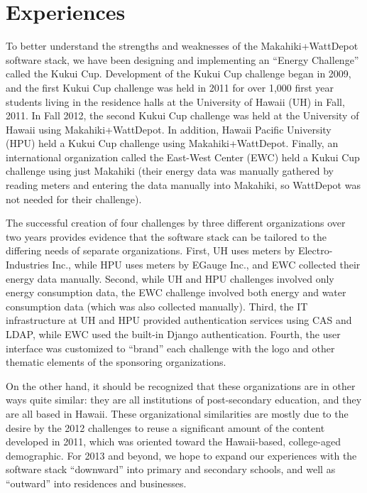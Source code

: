 \section{Experiences}

To better understand the strengths and weaknesses of the Makahiki+WattDepot software stack, we have been designing and implementing an ``Energy Challenge'' called the Kukui Cup.  Development of the Kukui Cup challenge began in 2009, and the first Kukui Cup challenge was held in 2011 for over 1,000 first year students living in the residence halls at the University of Hawaii (UH) in Fall, 2011.  In Fall 2012, the second Kukui Cup challenge was held at the University of Hawaii using Makahiki+WattDepot.  In addition, Hawaii Pacific University (HPU) held a Kukui Cup challenge using Makahiki+WattDepot. Finally, an international organization called the East-West Center (EWC) held a Kukui Cup challenge using just Makahiki (their energy data was manually gathered by reading meters and entering the data manually into Makahiki, so WattDepot was not needed for their challenge).

The successful creation of four challenges by three different organizations over two years provides evidence that the software stack can be tailored to the differing needs of separate organizations.  First, UH uses meters by Electro-Industries Inc., while HPU uses meters by EGauge Inc., and EWC collected their energy data manually. Second, while UH and HPU challenges involved only energy consumption data, the EWC challenge involved both energy and water consumption data (which was also collected manually).  Third, the IT infrastructure at UH and HPU provided authentication services using CAS and LDAP, while EWC used the built-in Django authentication. Fourth, the user interface was customized to ``brand'' each challenge with the logo and other thematic elements of the sponsoring organizations.

On the other hand, it should be recognized that these organizations are in other ways quite similar: they are all institutions of post-secondary education, and they are all based in Hawaii.  These organizational similarities are mostly due to the desire by the 2012 challenges to reuse a significant amount of the content developed in 2011, which was oriented toward the Hawaii-based, college-aged demographic. For 2013 and beyond, we hope to expand our experiences with the software stack  ``downward'' into primary and secondary schools, and well as ``outward'' into residences and businesses. 

